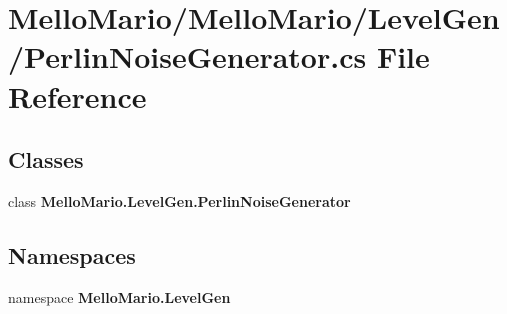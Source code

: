 \section{Mello\+Mario/\+Mello\+Mario/\+Level\+Gen/\+Perlin\+Noise\+Generator.cs File Reference}
\label{PerlinNoiseGenerator_8cs}
\subsection*{Classes}
\begin{DoxyCompactItemize}
\item 
class \textbf{ Mello\+Mario.\+Level\+Gen.\+Perlin\+Noise\+Generator}
\end{DoxyCompactItemize}
\subsection*{Namespaces}
\begin{DoxyCompactItemize}
\item 
namespace \textbf{ Mello\+Mario.\+Level\+Gen}
\end{DoxyCompactItemize}
